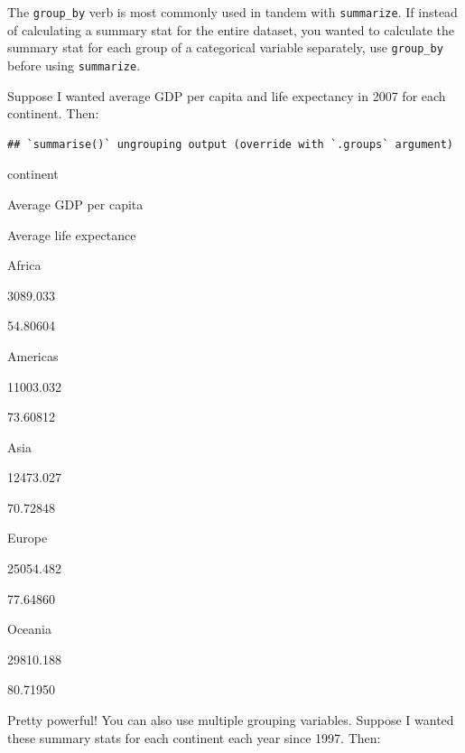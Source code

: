 \documentclass[
]{book}
\newenvironment{Shaded}{\begin{snugshade}}{\end{snugshade}}
\newcommand{\DataTypeTok}[1]{\textcolor[rgb]{0.13,0.29,0.53}{#1}}
\newcommand{\DecValTok}[1]{\textcolor[rgb]{0.00,0.00,0.81}{#1}}
\newcommand{\KeywordTok}[1]{\textcolor[rgb]{0.13,0.29,0.53}{\textbf{#1}}}
\newcommand{\NormalTok}[1]{#1}
\newcommand{\OperatorTok}[1]{\textcolor[rgb]{0.81,0.36,0.00}{\textbf{#1}}}
\newcommand{\StringTok}[1]{\textcolor[rgb]{0.31,0.60,0.02}{#1}}
\begin{document}
The \texttt{group\_by} verb is most commonly used in tandem with \texttt{summarize}. If instead of calculating a summary stat for the entire dataset, you wanted to calculate the summary stat for each group of a categorical variable separately, use \texttt{group\_by} before using \texttt{summarize}.

Suppose I wanted average GDP per capita and life expectancy in 2007 for each continent. Then:

\begin{Shaded}
\end{Shaded}

\begin{verbatim}
## `summarise()` ungrouping output (override with `.groups` argument)
\end{verbatim}

continent

Average GDP per capita

Average life expectance

Africa

3089.033

54.80604

Americas

11003.032

73.60812

Asia

12473.027

70.72848

Europe

25054.482

77.64860

Oceania

29810.188

80.71950

Pretty powerful! You can also use multiple grouping variables. Suppose I wanted these summary stats for each continent each year since 1997. Then:
\end{document}
